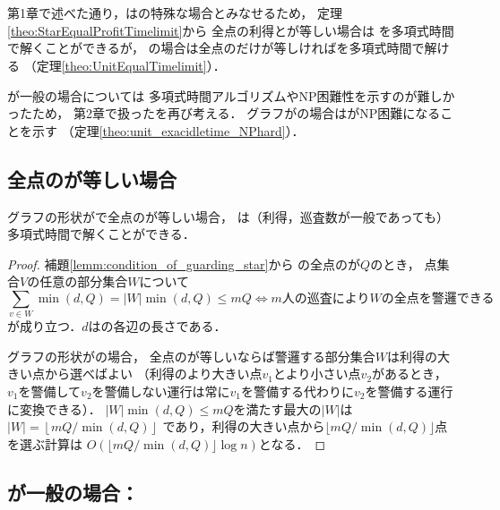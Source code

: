 \section{{\graphUnit}}
\label{section: unit}

第1章で述べた通り，{\graphUnit}は{\graphStar}の特殊な場合とみなせるため，
定理\ref{theo:StarEqualProfitTimelimit}から
全点の利得と{\idletime}が等しい場合は
{\patProb}を多項式時間で解くことができるが，
{\graphUnit}の場合は全点の{\idletime}だけが等しければ{\patProb}を多項式時間で解ける
（定理\ref{theo:UnitEqualTimelimit}）．

{\idletime}が一般の場合については
多項式時間アルゴリズムやNP困難性を示すのが難しかったため，
第2章で扱った{\timeSpecifiedPatProb}を再び考える．
グラフが{\graphUnit}の場合は{\timeSpecifiedPatProb}がNP困難になることを示す
（定理\ref{theo:unit_exacidletime_NPhard}）．



\subsection{全点の{\idletime}が等しい場合}

\begin{theo}
  \label{theo:UnitEqualTimelimit}
  グラフの形状が{\graphUnit}で全点の{\idletime}が等しい場合，
  {\patProb}は（利得，巡査数が一般であっても）多項式時間で解くことができる．
\end{theo}

\begin{proof}
  補題\ref{lemm:condition_of_guarding_star}から
  {\graphUnit}の全点の{\idletime}が$Q$のとき，
  点集合$V$の任意の部分集合$W$について
  $$
    \sum_{v \in W} \min(d, Q) = |W|\min(d, Q) \leq mQ
    \iff \text{$m$人の巡査により$W$の全点を警邏できる}
  $$
  が成り立つ．$d$は{\graphUnit}の各辺の長さである．

  グラフの形状が{\graphUnit}の場合，
  全点の{\idletime}が等しいならば警邏する部分集合$W$は利得の大きい点から選べばよい
  （利得のより大きい点$v_1$とより小さい点$v_2$があるとき，
  $v_1$を警備して$v_2$を警備しない運行は常に$v_1$を警備する代わりに$v_2$を警備する運行に変換できる）．
  $|W|\min(d, Q) \leq mQ$を満たす最大の$|W|$は
  $|W| = \left\lfloor {mQ}/{\min(d, Q)} \right\rfloor$
  であり，利得の大きい点から$\lfloor {mQ}/{\min(d, Q)} \rfloor$点を選ぶ計算は
  $O(\lfloor {mQ}/{\min(d, Q)} \rfloor \log n)$となる．
\end{proof}




\subsection{{\idletime}が一般の場合：{\timeSpecifiedPatProb}}


